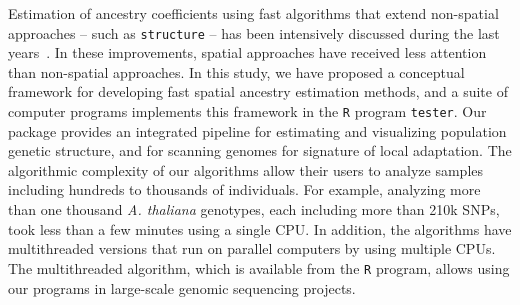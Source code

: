 Estimation of ancestry coefficients using fast algorithms that extend non-spatial approaches -- such as {\tt structure} -- has been intensively discussed during the last years~\citep{Wollstein2015}. In these improvements, spatial approaches have received less attention than non-spatial approaches. In this study, we have proposed a conceptual framework for developing fast spatial ancestry estimation methods, and a suite of computer programs implements this framework in the {\tt R} program {\tt tester}. Our package provides an integrated pipeline for estimating and visualizing population genetic structure,  and for scanning genomes for signature of local adaptation. The algorithmic complexity of our algorithms allow their users to analyze samples including hundreds to thousands of individuals. For example, analyzing more than one thousand {\it A. thaliana} genotypes, each including more than 210k SNPs, took less than a few minutes using a single CPU. In addition, the algorithms have multithreaded versions that run on parallel computers by using multiple CPUs. The multithreaded algorithm, which is available from the {\tt R} program, allows using our programs in large-scale genomic sequencing projects. 

 
 
 



 























